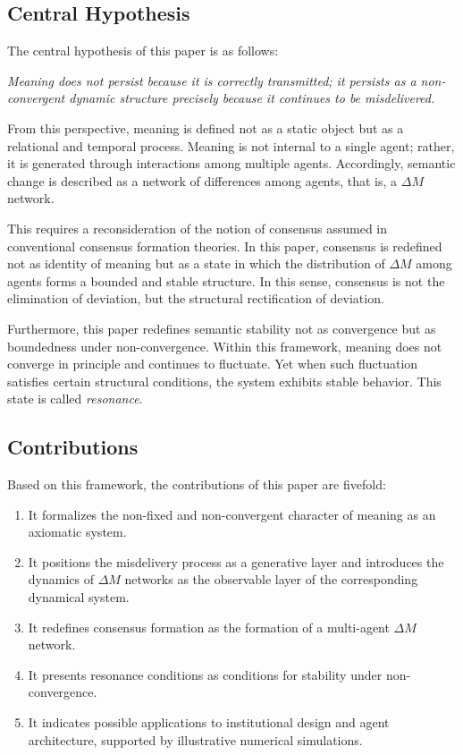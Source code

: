 \documentclass[11pt,a4paper]{article}
\theoremstyle{definition}
\begin{document}
\subsection{Central Hypothesis}

The central hypothesis of this paper is as follows:

\textit{Meaning does not persist because it is correctly transmitted; it persists as a non-convergent dynamic structure precisely because it continues to be misdelivered.}

From this perspective, meaning is defined not as a static object but as a relational and temporal process. Meaning is not internal to a single agent; rather, it is generated through interactions among multiple agents. Accordingly, semantic change is described as a network of differences among agents, that is, a $\Delta M$ network.

This requires a reconsideration of the notion of consensus assumed in conventional consensus formation theories. In this paper, consensus is redefined not as identity of meaning but as a state in which the distribution of $\Delta M$ among agents forms a bounded and stable structure. In this sense, consensus is not the elimination of deviation, but the structural rectification of deviation.

Furthermore, this paper redefines semantic stability not as convergence but as boundedness under non-convergence. Within this framework, meaning does not converge in principle and continues to fluctuate. Yet when such fluctuation satisfies certain structural conditions, the system exhibits stable behavior. This state is called \textit{resonance}.

\subsection{Contributions}

Based on this framework, the contributions of this paper are fivefold:

\begin{enumerate}
\item It formalizes the non-fixed and non-convergent character of meaning as an axiomatic system.
\item It positions the misdelivery process as a generative layer and introduces the dynamics of $\Delta M$ networks as the observable layer of the corresponding dynamical system.
\item It redefines consensus formation as the formation of a multi-agent $\Delta M$ network.
\item It presents resonance conditions as conditions for stability under non-convergence.
\item It indicates possible applications to institutional design and agent architecture, supported by illustrative numerical simulations.
\end{enumerate}
\end{document}
